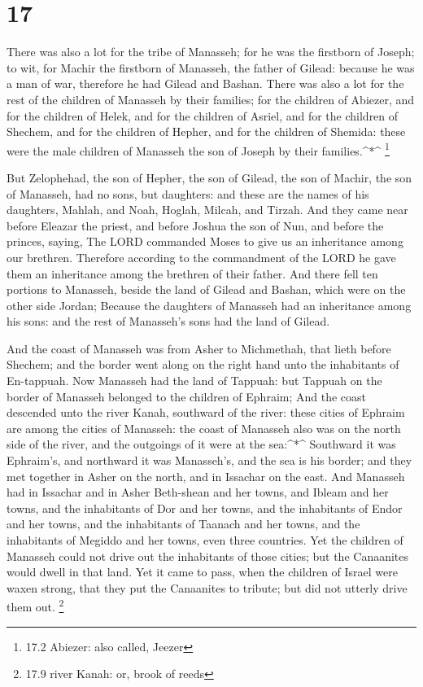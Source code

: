 \hypertarget{section-16}{%
\section{17}\label{section-16}}

 There was also a lot for the tribe of Manasseh; for he was
the firstborn of Joseph; to wit, for Machir the firstborn of Manasseh,
the father of Gilead: because he was a man of war, therefore he had
Gilead and Bashan.  There was also a lot for the rest of the
children of Manasseh by their families; for the children of Abiezer, and
for the children of Helek, and for the children of Asriel, and for the
children of Shechem, and for the children of Hepher, and for the
children of Shemida: these were the male children of Manasseh the son of
Joseph by their families.\^{}*\^{} \footnote{17.2 Abiezer: also called,
  Jeezer}

 But Zelophehad, the son of Hepher, the son of Gilead, the
son of Machir, the son of Manasseh, had no sons, but daughters: and
these are the names of his daughters, Mahlah, and Noah, Hoglah, Milcah,
and Tirzah.  And they came near before Eleazar the priest,
and before Joshua the son of Nun, and before the princes, saying, The
LORD commanded Moses to give us an inheritance among our brethren.
Therefore according to the commandment of the LORD he gave them an
inheritance among the brethren of their father.  And there
fell ten portions to Manasseh, beside the land of Gilead and Bashan,
which were on the other side Jordan;  Because the daughters
of Manasseh had an inheritance among his sons: and the rest of
Manasseh's sons had the land of Gilead.

 And the coast of Manasseh was from Asher to Michmethah,
that lieth before Shechem; and the border went along on the right hand
unto the inhabitants of En-tappuah.  Now Manasseh had the
land of Tappuah: but Tappuah on the border of Manasseh belonged to the
children of Ephraim;  And the coast descended unto the river
Kanah, southward of the river: these cities of Ephraim are among the
cities of Manasseh: the coast of Manasseh also was on the north side of
the river, and the outgoings of it were at the sea:\^{}*\^{}
 Southward it was Ephraim's, and northward it was
Manasseh's, and the sea is his border; and they met together in Asher on
the north, and in Issachar on the east.  And Manasseh had
in Issachar and in Asher Beth-shean and her towns, and Ibleam and her
towns, and the inhabitants of Dor and her towns, and the inhabitants of
Endor and her towns, and the inhabitants of Taanach and her towns, and
the inhabitants of Megiddo and her towns, even three countries.
 Yet the children of Manasseh could not drive out the
inhabitants of those cities; but the Canaanites would dwell in that
land.  Yet it came to pass, when the children of Israel
were waxen strong, that they put the Canaanites to tribute; but did not
utterly drive them out. \footnote{17.9 river Kanah: or, brook of reeds}


